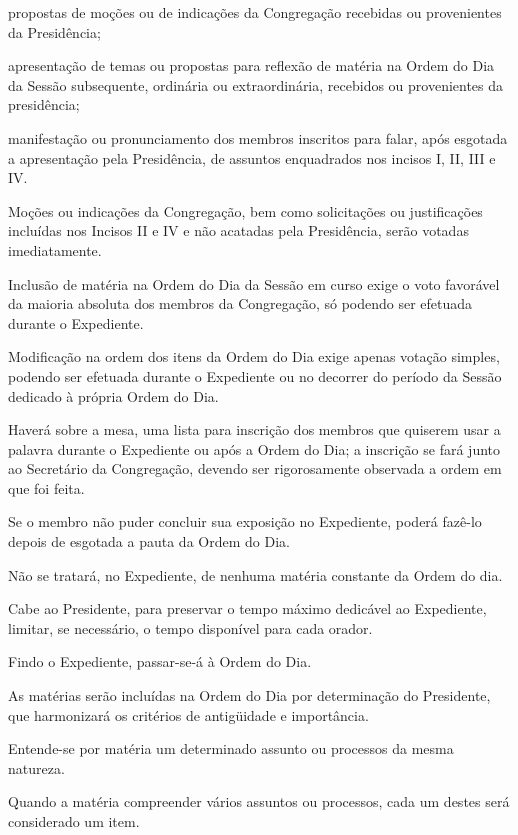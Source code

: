 \documentclass{documento}
\begin{document}
\inciso propostas de moções ou de indicações da Congregação recebidas ou provenientes da Presidência;

\inciso apresentação de temas ou propostas para reflexão de matéria na Ordem do Dia da Sessão subsequente, ordinária ou extraordinária, recebidos ou provenientes da presidência;

\inciso manifestação ou pronunciamento dos membros inscritos para falar, após esgotada a apresentação pela Presidência, de assuntos enquadrados nos incisos I, II, III e IV.

\paragrafo Moções ou indicações da Congregação, bem como solicitações ou justificações incluídas nos Incisos II e IV e não acatadas pela Presidência, serão votadas imediatamente.

\paragrafo Inclusão de matéria na Ordem do Dia da Sessão em curso exige o voto favorável da maioria absoluta dos membros da Congregação, só podendo ser efetuada durante o Expediente.

\paragrafo Modificação na ordem dos itens da Ordem do Dia exige apenas votação simples, podendo ser efetuada durante o Expediente ou no decorrer do período da Sessão dedicado à própria Ordem do Dia.

\paragrafo Haverá sobre a mesa, uma lista para inscrição dos membros que quiserem usar a palavra durante o Expediente ou após a Ordem do Dia; a inscrição se fará junto ao Secretário da Congregação, devendo ser rigorosamente observada a ordem em que foi feita.

\paragrafo Se o membro não puder concluir sua exposição no Expediente, poderá fazê-lo depois de esgotada a pauta da Ordem do Dia.

\paragrafo Não se tratará, no Expediente, de nenhuma matéria constante da Ordem do dia.

\paragrafo Cabe ao Presidente, para preservar o tempo máximo dedicável ao Expediente, limitar, se necessário, o tempo disponível para cada orador.


\artigo Findo o Expediente, passar-se-á à Ordem do Dia.

\artigo As matérias serão incluídas na Ordem do Dia por determinação do Presidente, que harmonizará os critérios de antigüidade e importância.

\paragrafo Entende-se por matéria um determinado assunto ou processos da mesma natureza.

\paragrafo Quando a matéria compreender vários assuntos ou processos, cada um destes será considerado um item.
\end{document}
